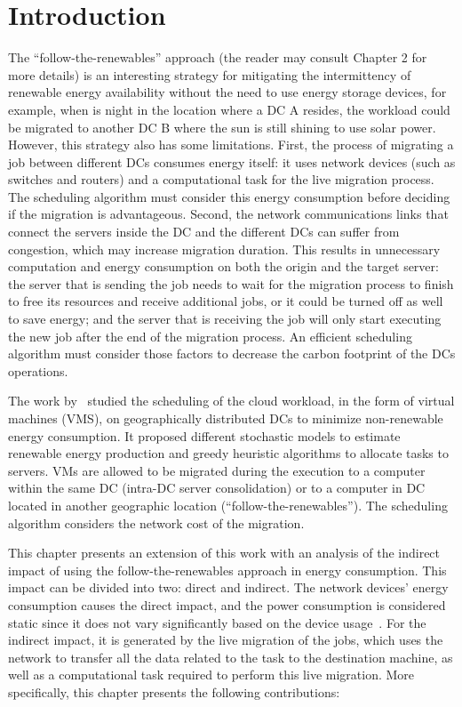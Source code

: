 \section{Introduction}

The ``follow-the-renewables'' approach (the reader may consult Chapter 2 for more details) is an interesting strategy for mitigating the intermittency of renewable energy availability without the need to use energy storage devices, for example, when is night in the location where a DC A resides, the workload could be migrated to another DC B where the sun is still shining to use solar power. However, this strategy also has some limitations. First, the process of migrating a job between different DCs consumes energy itself: it uses network devices (such as switches and routers) and a computational task for the live migration process. The scheduling algorithm must consider this energy consumption before deciding if the migration is advantageous. Second, the network communications links that connect the servers inside the DC and the different DCs can suffer from congestion, which may increase migration duration. This results in unnecessary computation and energy consumption on both the origin and the target server: the server that is sending the job needs to wait for the migration process to finish to free its resources and receive additional jobs, or it could be turned off as well to save energy; and the server that is receiving the job will only start executing the new job after the end of the migration process. An efficient scheduling algorithm must consider those factors to decrease the carbon footprint of the DCs operations.

The work by~\citet{SAGITTA,NEMESIS} studied the scheduling of the cloud workload, in the form of virtual machines (VMS), on geographically distributed DCs to minimize non-renewable energy consumption. It proposed different stochastic models to estimate renewable energy production and greedy heuristic algorithms to allocate tasks to servers. VMs are allowed to be migrated during the execution to a computer within the same DC (intra-DC server consolidation)  or to a computer in DC located in another geographic location (``follow-the-renewables''). The scheduling algorithm considers the network cost of the migration.

This chapter presents an extension of this work with an analysis of the indirect impact of using the follow-the-renewables approach in energy consumption. This impact can be divided into two: direct and indirect. The network devices' energy consumption causes the direct impact, and the power consumption is considered static since it does not vary significantly based on the device usage~\cite{energy_network_devices}. For the indirect impact, it is generated by the live migration of the jobs, which uses the network to transfer all the data related to the task to the destination machine, as well as a computational task required to perform this live migration. More specifically, this chapter presents the following contributions:

